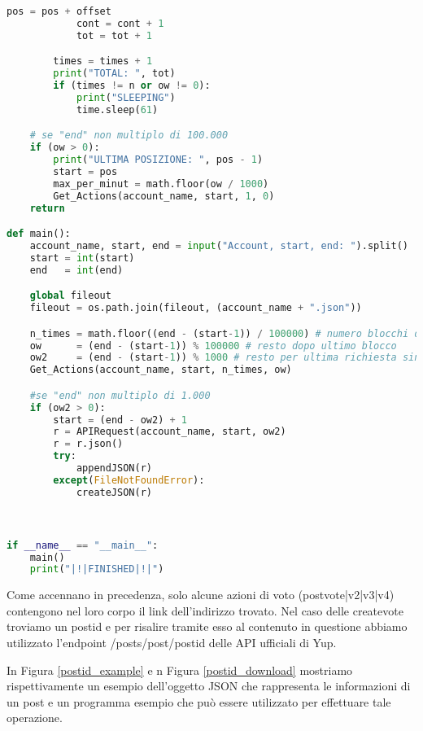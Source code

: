 \begin{lstlisting}[language=Python, label={actions_download}, captionpos=b, caption=Actions Retrieval]
            pos = pos + offset
            cont = cont + 1
            tot = tot + 1

        times = times + 1
        print("TOTAL: ", tot)
        if (times != n or ow != 0):
            print("SLEEPING")
            time.sleep(61)

    # se "end" non multiplo di 100.000
    if (ow > 0):
        print("ULTIMA POSIZIONE: ", pos - 1)
        start = pos
        max_per_minut = math.floor(ow / 1000)
        Get_Actions(account_name, start, 1, 0)
    return

def main():
    account_name, start, end = input("Account, start, end: ").split()
    start = int(start)
    end   = int(end)

    global fileout
    fileout = os.path.join(fileout, (account_name + ".json"))

    n_times = math.floor((end - (start-1)) / 100000) # numero blocchi da 100.000 azioni (100 richieste)
    ow      = (end - (start-1)) % 100000 # resto dopo ultimo blocco
    ow2     = (end - (start-1)) % 1000 # resto per ultima richiesta singola
    Get_Actions(account_name, start, n_times, ow)

    #se "end" non multiplo di 1.000
    if (ow2 > 0):
        start = (end - ow2) + 1
        r = APIRequest(account_name, start, ow2)
        r = r.json()
        try:
            appendJSON(r)
        except(FileNotFoundError):
            createJSON(r)



if __name__ == "__main__":
    main()
    print("|!|FINISHED|!|")
\end{lstlisting}


Come accennano in precedenza, solo alcune azioni di voto (postvote|v2|v3|v4) contengono nel loro corpo il link dell'indirizzo trovato. Nel caso delle createvote troviamo un postid e per risalire tramite esso al contenuto in questione abbiamo utilizzato l'endpoint /posts/post/{postid} delle API ufficiali di Yup.


In Figura \ref{postid_example} e n Figura \ref{postid_download} mostriamo rispettivamente un esempio dell'oggetto JSON che rappresenta le informazioni di un post e un programma esempio che può essere utilizzato per effettuare tale operazione.

